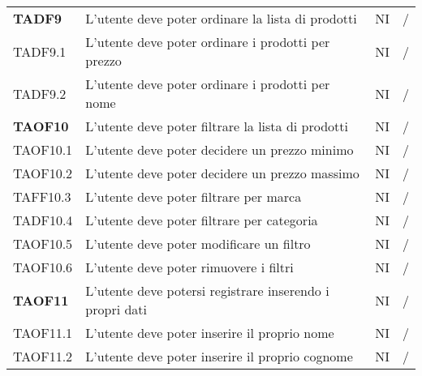 \begin{center}
\begin{longtable}[!h]{p{60px} p{240px} p{35px} p{35px}}
        \textbf{TADF9}  & L'utente deve poter ordinare la lista di prodotti                                                   & NI             & /              \\
        TADF9.1         & L'utente deve poter ordinare i prodotti per prezzo                                                  & NI             & /              \\
        TADF9.2         & L'utente deve poter ordinare i prodotti per nome                                                    & NI             & /              \\
        \textbf{TAOF10} & L'utente deve poter filtrare la lista di prodotti                                                   & NI             & /              \\
        TAOF10.1        & L'utente deve poter decidere un prezzo minimo                                                       & NI             & /              \\
        TAOF10.2        & L'utente deve poter decidere un prezzo massimo                                                      & NI             & /              \\
        TAFF10.3        & L'utente deve poter filtrare per marca                                                              & NI             & /              \\
        TADF10.4        & L'utente deve poter filtrare per categoria                                                          & NI             & /              \\
        TAOF10.5        & L'utente deve poter modificare un filtro                                                            & NI             & /              \\
        TAOF10.6        & L'utente deve poter rimuovere i filtri                                                              & NI             & /              \\
        \textbf{TAOF11} & L'utente deve potersi registrare inserendo i propri dati                                            & NI             & /              \\
        TAOF11.1        & L'utente deve poter inserire il proprio nome                                                        & NI             & /              \\
        TAOF11.2        & L'utente deve poter inserire il proprio cognome                                                     & NI             & /              \\

\end{longtable}
\end{center}
